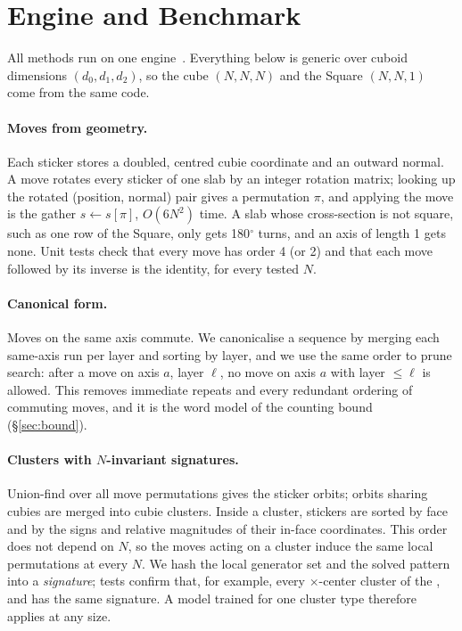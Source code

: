 \section{Engine and Benchmark}
\label{sec:engine}

All methods run on one engine~\cite{rubikrepo}. Everything below is generic over cuboid dimensions
$(d_0,d_1,d_2)$, so the cube $(N,N,N)$ and the Square $(N,N,1)$ come from the same code.

\paragraph{Moves from geometry.}
Each sticker stores a doubled, centred cubie coordinate and an outward normal. A move rotates every sticker of one
slab by an integer rotation matrix; looking up the rotated (position, normal) pair gives a permutation $\pi$, and
applying the move is the gather $s\leftarrow s[\pi]$, $O(6N^2)$ time. A slab whose cross-section is not square, such
as one row of the Square, only gets 180$^\circ$ turns, and an axis of length 1 gets none. Unit tests check that every
move has order 4 (or 2) and that each move followed by its inverse is the identity, for every tested $N$.

\paragraph{Canonical form.}
Moves on the same axis commute. We canonicalise a sequence by merging each same-axis run per layer and sorting by
layer, and we use the same order to prune search: after a move on axis $a$, layer $\ell$, no move on axis $a$ with
layer $\le\ell$ is allowed. This removes immediate repeats and every redundant ordering of commuting moves, and it is
the word model of the counting bound (\S\ref{sec:bound}).

\paragraph{Clusters with $N$-invariant signatures.}
Union-find over all move permutations gives the sticker orbits; orbits sharing cubies are merged into cubie clusters.
Inside a cluster, stickers are sorted by face and by the signs and relative magnitudes of their in-face coordinates.
This order does not depend on $N$, so the moves acting on a cluster induce the same local permutations at every $N$.
We hash the local generator set and the solved pattern into a \emph{signature}; tests confirm that, for example, every
$\times$-center cluster of the ,  and  has the same signature. A model trained for one cluster type
therefore applies at any size.

